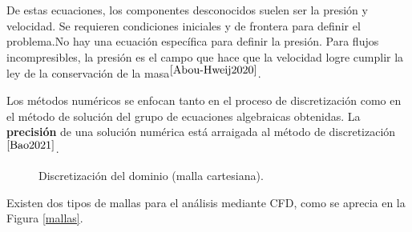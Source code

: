\noindent
\justify

De estas ecuaciones, los componentes desconocidos suelen ser la presi\'on y velocidad. Se requieren condiciones iniciales y de frontera para definir el problema.No hay una ecuaci\'on espec\'ifica para definir la presi\'on. Para flujos incompresibles, la presi\'on es el campo que hace que la velocidad logre cumplir la ley de la conservaci\'on de la masa$^{\cite{Abou-Hweij2020}}$.

\noindent
\justify

Los m\'etodos num\'ericos se enfocan tanto en el proceso de discretizaci\'on como en el m\'etodo de soluci\'on del grupo de ecuaciones algebraicas obtenidas. La \textbf{precisi\'on} de una soluci\'on num\'erica est\'a arraigada al m\'etodo de discretizaci\'on$^{\cite{Bao2021}}$.

\begin{figure}[h!]
	\centering
	\caption{Discretizaci\'on del dominio (malla cartesiana).}
	\label{elemento}
\end{figure}

\newpage

\noindent
\justify

Existen dos tipos de mallas para el an\'alisis mediante CFD, como se aprecia en la Figura \ref{mallas}.

